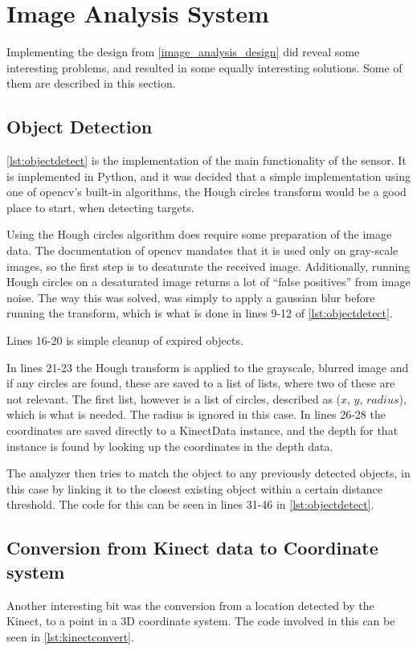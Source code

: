 \section{Image Analysis System}

Implementing the design from \autoref{image_analysis_design} did reveal some interesting problems, and resulted in
some equally interesting solutions. Some of them are described in this section.

\subsection{Object Detection}
\autoref{lst:objectdetect} is the implementation of the main functionality of the sensor. It is implemented in Python, and it was decided that a simple implementation using one of \ac{opencv}'s built-in algorithms, the Hough circles transform would be a good place to start, when detecting targets.



Using the Hough circles algorithm does require some preparation of the image data.
The documentation of \ac{opencv} mandates that it is used only on gray-scale images, so the first step is to desaturate the received image. Additionally, running Hough circles on a desaturated image returns a lot of ``false positives'' from image noise. The way
this was solved, was simply to apply a gaussian blur before running the transform, which is what is done in lines 9-12 of \autoref{lst:objectdetect}. 

Lines 16-20 is simple cleanup of expired objects.

In lines 21-23 the Hough transform is applied to the grayscale, blurred image and if any circles are found, these are saved to a list of lists, where two of these are not relevant. The first list, however is a list of circles, described as ($x$, $y$, $radius$), which is what is needed. The radius is ignored in this case. In lines  26-28 the coordinates are saved directly to a KinectData instance, and the depth for that instance is found by looking up the coordinates in the depth data.

The analyzer then tries to match the object to any previously detected objects, in this case by linking it to the closest
existing object within a certain distance threshold. The code for this can be seen in lines 31-46 in \autoref{lst:objectdetect}. 

\subsection{Conversion from Kinect data to Coordinate system}
Another interesting bit
was the conversion from a location detected by the Kinect, to a point in a 3D coordinate system. The code involved
in this can be seen in \autoref{lst:kinectconvert}. 

